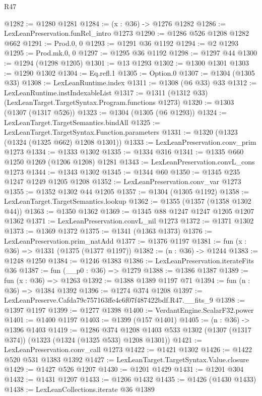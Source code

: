 \begin{lexlean}{R47}
\begin{coremodule}
@1282 := @1280 @1281
@1284 := (x : @36) -> @1276 @1282
@1286 := LexLeanPreservation.funRel_intro @1273
@1290 := @1286 @526 @1208 @1282 @662
@1291 := Prod.{0, 0}
@1293 := @1291 @36 @1192
@1294 := @2 @1293
@1295 := Prod.mk.{0, 0}
@1297 := @1295 @36 @1192
@1298 := @1297 @44
@1300 := @1294 (@1298 @1205)
@1301 := @13 @1293
@1302 := @1300 @1301
@1303 := @1290 @1302
@1304 := Eq.refl.{1}
@1305 := Option.{0}
@1307 := @1304 (@1305 @33)
@1308 := LexLeanRuntime.index
@1311 := @1308 (@6 @33) @33
@1312 := LexLeanRuntime.instIndexableList
@1317 := @1311 (@1312 @33) (LexLeanTarget.TargetSyntax.Program.functions @1273)
@1320 := @1303 (@1307 (@1317 @526))
@1323 := @1304 (@1305 (@6 @1293))
@1324 := LexLeanTarget.TargetSemantics.bindAll
@1325 := LexLeanTarget.TargetSyntax.Function.parameters
@1331 := @1320 (@1323 (@1324 (@1325 @662) @1208 @1301))
@1333 := LexLeanPreservation.conv_prim @1273
@1334 := @1333 @1302
@1335 := @1334 @316
@1341 := @1335 @660 @1250 @1269 (@1206 @1208) @1281
@1343 := LexLeanPreservation.convL_cons @1273
@1344 := @1343 @1302
@1345 := @1344 @60
@1350 := @1345 @235 @1247 @1249 @1205 @1208
@1352 := LexLeanPreservation.conv_var @1273
@1355 := @1352 @1302 @44 @1205
@1357 := @1304 (@1305 @1192)
@1358 := LexLeanTarget.TargetSemantics.lookup
@1362 := @1355 (@1357 (@1358 @1302 @44))
@1363 := @1350 @1362
@1369 := @1345 @88 @1247 @1247 @1205 @1207 @1362
@1371 := LexLeanPreservation.convL_nil @1273
@1372 := @1371 @1302
@1373 := @1369 @1372
@1375 := @1341 (@1363 @1373)
@1376 := LexLeanPreservation.prim_natAdd
@1377 := @1376 @1197
@1381 := fun (x : @36) => @1331 (@1375 (@1377 @1197))
@1382 := (n : @36) -> @1244
@1383 := @1248 @1250
@1384 := @1246 @1383
@1386 := LexLeanPreservation.iterateFits @36
@1387 := fun (__p0 : @36) => @1279
@1388 := @1386 @1387
@1389 := fun (x : @36) => @1263
@1392 := @1388 @1389 @1197 @71
@1394 := fun (n : @36) => @1384 @1392
@1396 := @1274 @374 @1208
@1397 := LexLeanPreserve.Cafda79c757163ffe4c6f07f487422bdf.R47.__fits_9
@1398 := @1397 @1197
@1399 := @1277 @1398
@1400 := VerdantEngine.ScalarF32.power
@1401 := @1400 @1197
@1403 := @1399 (@157 @1401)
@1405 := (n : @36) -> @1396 @1403
@1419 := @1286
    @374
    @1208
    @1403
    @533
    @1302
    (@1307 (@1317 @374))
    (@1323 (@1324 (@1325 @533) @1208 @1301))
@1421 := LexLeanPreservation.conv_call @1273
@1422 := @1421 @1302
@1426 := @1422 @520 @531 @1383 @1392
@1427 := LexLeanTarget.TargetSyntax.Value.closure
@1429 := @1427 @526 @1207
@1430 := @1201 @1429
@1431 := @1201 @304
@1432 := @1431 @1207
@1433 := @1206 @1432
@1435 := @1426 (@1430 @1433)
@1438 := LexLeanCollections.iterate @36 @1389

\end{coremodule}
\end{lexlean}
